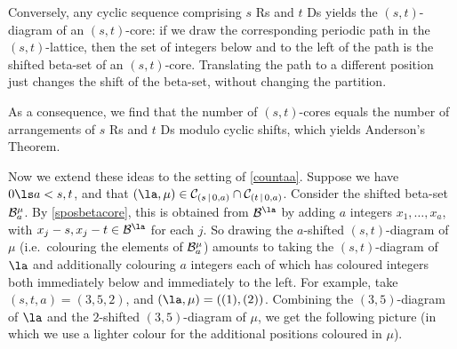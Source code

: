 \documentclass[a4paper, 11pt, twoside]{article}
\begin{document}
Conversely, any cyclic sequence comprising $s$ Rs and $t$ Ds yields the $(s,t)$-diagram of an $(s,t)$-core: if we draw the corresponding periodic path in the $(s,t)$-lattice, then the set of integers below and to the left of the path is the shifted beta-set of an $(s,t)$-core. Translating the path to a different position just changes the shift of the beta-set, without changing the partition.

As a consequence, we find that the number of $(s,t)$-cores equals the number of arrangements of $s$ Rs and $t$ Ds modulo cyclic shifts, which yields Anderson's Theorem.

Now we extend these ideas to the setting of \cref{countaa}. Suppose we have $0\ls a<s,t$, and that $(\la,\mu)\in\bc sa\cap\bc ta$. Consider the shifted beta-set $\mathcal{B}^{\mu}_{a}$. By \ref{sposbetacore}, this is obtained from $\be\la$ by adding $a$ integers $x_1,\dots,x_a$, with $x_j-s,x_j-t\in\be\la$ for each $j$. So drawing the $a$-shifted $(s,t)$-diagram of $\mu$ (i.e.\ colouring the elements of $\mathcal{B}^{\mu}_{a}$) amounts to taking the $(s,t)$-diagram of $\la$ and additionally colouring $a$ integers each of which has coloured integers both immediately below and immediately to the left. For example, take $(s,t,a)=(3,5,2)$, and $(\la,\mu)=((1),(2))$. Combining the $(3,5)$-diagram of $\la$ and the $2$-shifted $(3,5)$-diagram of $\mu$, we get the following picture (in which we use a lighter colour for the additional positions coloured in $\mu$).
\end{document}
